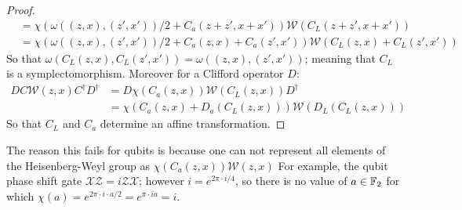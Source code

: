 \begin{proof}
\begin{align*}
&= \chi(\omega((z,x),(z',x'))/2+C_a(z+z',x+x')) \mathcal{W}(C_{L}(z+z',x+x'))\\
&= \chi(\omega((z,x),(z',x'))/2+C_a(z,x)+ C_a(z',x')) \mathcal{W}(C_L(z,x)+C_L(z',x'))
\end{align*}
So that $\omega(C_L(z,x),C_L(z',x')) = \omega((z,x),(z',x'))$; meaning that $C_L$ is a symplectomorphism. Moreover for a Clifford operator $D$:
\begin{align*}
DC {\mathcal W}(z,x) C^\dag D^\dag
&=D\chi(C_a(z,x)){\mathcal W}(C_L(z,x))D^\dag\\
&=\chi(C_a(z,x)+D_a(C_L(z,x))){\mathcal W}(D_L(C_L(z,x)))
\end{align*}
So that $C_L$ and $C_a$ determine an affine transformation.
\end{proof}\endgroup
The reason this fails for qubits is because one can not represent all elements of the Heisenberg-Weyl group as 
$
\chi(C_a(z,x)){\mathcal W}(z,x)
$
 For example, the qubit phase shift gate $\mathcal{X}\mathcal{Z} = i \mathcal{Z}\mathcal{X}$; however $i=e^{2\pi \cdot i/4}$, so there is no value of $a\in \mathbb{F}_2$ for which $\chi(a)=e^{2\pi\cdot i\cdot a/2} =e^{\pi\cdot i a} = i$.

